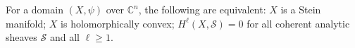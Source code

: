 For a domain $(X, \psi)$ over $\mathbb{C}^n$, the following are equivalent: $X$ is a Stein manifold; $X$ is holomorphically convex; $H^\ell(X, \mathcal{S}) = 0$ for all coherent analytic sheaves $\mathcal{S}$ and all $\ell \geqslant 1$.
